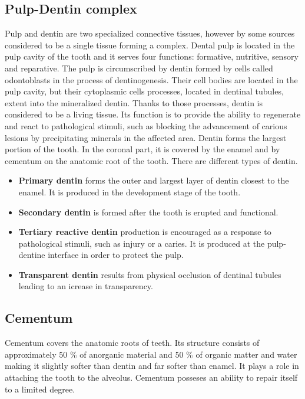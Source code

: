 \subsection*{Pulp-Dentin complex}
Pulp and dentin are two specialized connective tissues, however by some sources considered to be a single tissue forming a complex.
Dental pulp is located in the pulp cavity of the tooth and it serves four functions: formative, nutritive, sensory and reparative.
The pulp is circumscribed by dentin formed by cells called odontoblasts in the process of dentinogenesis. Their cell bodies are located in the pulp cavity, but their cytoplasmic cells processes, located in dentinal tubules,  extent into the  mineralized dentin. Thanks to those processes, dentin is considered to be a living tissue. Its function is to provide the ability to regenerate and react to pathological stimuli, such as blocking the advancement of carious lesions by precipitating minerals in the affected area.
Dentin forms the largest portion of the tooth. In the coronal part, it is covered by the enamel and by cementum on the anatomic root of the tooth. There are different types of dentin.
\begin{itemize}
    \item \textbf{Primary dentin} forms the outer and largest layer of dentin closest to the enamel. It is produced in the development stage of the tooth.
    \item \textbf {Secondary dentin} is formed after the tooth is erupted and functional.
    \item \textbf{Tertiary reactive dentin} production is encouraged as a response to pathological stimuli, such as injury or a caries. It is produced at the pulp-dentine interface in order to protect the pulp. 
    \item \textbf{Transparent dentin} results from physical occlusion of dentinal tubules leading to an icrease in transparency.
\end{itemize}


\subsection*{Cementum}
Cementum covers the anatomic roots of teeth. Its structure consists of approximately 50 \% of anorganic material and 50 \% of organic matter and water making it slightly softer than dentin and far softer than enamel. It plays a role in attaching the tooth to the alveolus. Cementum posseses an ability to repair itself to a limited degree. 

